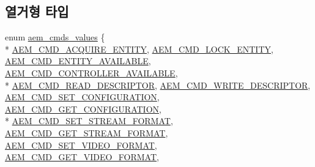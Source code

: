 \subsection*{열거형 타입}
\begin{DoxyCompactItemize}
\item 
enum \hyperlink{namespaceavdecc__lib_a1631d53b37995d16b597a5e1a78c55a5}{aem\+\_\+cmds\+\_\+values} \{ \\*
\hyperlink{namespaceavdecc__lib_a1631d53b37995d16b597a5e1a78c55a5a4380655f320ea7d90aae73aee9f4b0db}{A\+E\+M\+\_\+\+C\+M\+D\+\_\+\+A\+C\+Q\+U\+I\+R\+E\+\_\+\+E\+N\+T\+I\+TY}, 
\hyperlink{namespaceavdecc__lib_a1631d53b37995d16b597a5e1a78c55a5a232963dd7f478c6bcdc9251ab34d9b49}{A\+E\+M\+\_\+\+C\+M\+D\+\_\+\+L\+O\+C\+K\+\_\+\+E\+N\+T\+I\+TY}, 
\hyperlink{namespaceavdecc__lib_a1631d53b37995d16b597a5e1a78c55a5ae7d184a5b20659bf394f13b4137e2e9c}{A\+E\+M\+\_\+\+C\+M\+D\+\_\+\+E\+N\+T\+I\+T\+Y\+\_\+\+A\+V\+A\+I\+L\+A\+B\+LE}, 
\hyperlink{namespaceavdecc__lib_a1631d53b37995d16b597a5e1a78c55a5a566da9ba4bdd44ee9dc3e565b342c3b1}{A\+E\+M\+\_\+\+C\+M\+D\+\_\+\+C\+O\+N\+T\+R\+O\+L\+L\+E\+R\+\_\+\+A\+V\+A\+I\+L\+A\+B\+LE}, 
\\*
\hyperlink{namespaceavdecc__lib_a1631d53b37995d16b597a5e1a78c55a5a072a93ad9a8e9d7386eb2572bc0c7654}{A\+E\+M\+\_\+\+C\+M\+D\+\_\+\+R\+E\+A\+D\+\_\+\+D\+E\+S\+C\+R\+I\+P\+T\+OR}, 
\hyperlink{namespaceavdecc__lib_a1631d53b37995d16b597a5e1a78c55a5a17701972ca091debf4474971f494543e}{A\+E\+M\+\_\+\+C\+M\+D\+\_\+\+W\+R\+I\+T\+E\+\_\+\+D\+E\+S\+C\+R\+I\+P\+T\+OR}, 
\hyperlink{namespaceavdecc__lib_a1631d53b37995d16b597a5e1a78c55a5a5134fc482edafa6590c07376f1f46267}{A\+E\+M\+\_\+\+C\+M\+D\+\_\+\+S\+E\+T\+\_\+\+C\+O\+N\+F\+I\+G\+U\+R\+A\+T\+I\+ON}, 
\hyperlink{namespaceavdecc__lib_a1631d53b37995d16b597a5e1a78c55a5a1d6b86e7baad199941750fef13bb497a}{A\+E\+M\+\_\+\+C\+M\+D\+\_\+\+G\+E\+T\+\_\+\+C\+O\+N\+F\+I\+G\+U\+R\+A\+T\+I\+ON}, 
\\*
\hyperlink{namespaceavdecc__lib_a1631d53b37995d16b597a5e1a78c55a5a8829a20eda7bc78710495033864d2f90}{A\+E\+M\+\_\+\+C\+M\+D\+\_\+\+S\+E\+T\+\_\+\+S\+T\+R\+E\+A\+M\+\_\+\+F\+O\+R\+M\+AT}, 
\hyperlink{namespaceavdecc__lib_a1631d53b37995d16b597a5e1a78c55a5a9f362079c9ce2d86622ac52d52ae98a2}{A\+E\+M\+\_\+\+C\+M\+D\+\_\+\+G\+E\+T\+\_\+\+S\+T\+R\+E\+A\+M\+\_\+\+F\+O\+R\+M\+AT}, 
\hyperlink{namespaceavdecc__lib_a1631d53b37995d16b597a5e1a78c55a5aabde866cc35cb1ec3d50290e6e75f741}{A\+E\+M\+\_\+\+C\+M\+D\+\_\+\+S\+E\+T\+\_\+\+V\+I\+D\+E\+O\+\_\+\+F\+O\+R\+M\+AT}, 
\hyperlink{namespaceavdecc__lib_a1631d53b37995d16b597a5e1a78c55a5a75111cddea2c8840015b11693369b334}{A\+E\+M\+\_\+\+C\+M\+D\+\_\+\+G\+E\+T\+\_\+\+V\+I\+D\+E\+O\+\_\+\+F\+O\+R\+M\+AT}, 

\end{DoxyCompactItemize}
